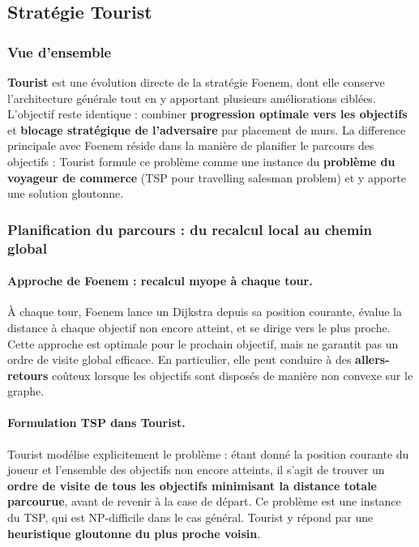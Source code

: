 \documentclass[12pt,a4paper]{article}
\begin{document}
\subsection{Stratégie Tourist}

\subsubsection{Vue d'ensemble}

\textbf{Tourist} est une évolution directe de la stratégie Foenem, dont elle 
conserve l'architecture générale tout en y apportant plusieurs améliorations 
ciblées. L'objectif reste identique : combiner \textbf{progression optimale vers 
les objectifs} et \textbf{blocage stratégique de l'adversaire} par placement de 
murs. La difference principale avec Foenem réside dans la manière de planifier 
le parcours des objectifs : Tourist formule ce problème comme une instance du 
\textbf{problème du voyageur de commerce} (TSP pour travelling salesman problem) et y apporte une solution gloutonne.

\subsubsection{Planification du parcours : du recalcul local au chemin global}

\paragraph{Approche de Foenem : recalcul myope à chaque tour.}
À chaque tour, Foenem lance un Dijkstra depuis sa position courante, évalue 
la distance à chaque objectif non encore atteint, et se dirige vers le plus 
proche. Cette approche est optimale 
pour le prochain objectif, mais ne garantit pas un ordre de visite global 
efficace. En particulier, elle peut conduire à des \textbf{allers-retours} 
coûteux lorsque les objectifs sont disposés de manière non convexe sur le graphe.

\paragraph{Formulation TSP dans Tourist.}
Tourist modélise explicitement le problème : étant donné la position courante 
du joueur et l'ensemble des objectifs non encore atteints, il s'agit de trouver 
un \textbf{ordre de visite de tous les objectifs minimisant la distance totale 
parcourue}, avant de revenir à la case de départ. Ce problème est une instance 
du TSP, qui est NP-difficile dans le cas général. Tourist y répond par une 
\textbf{heuristique gloutonne du plus proche voisin}.
\end{document}
